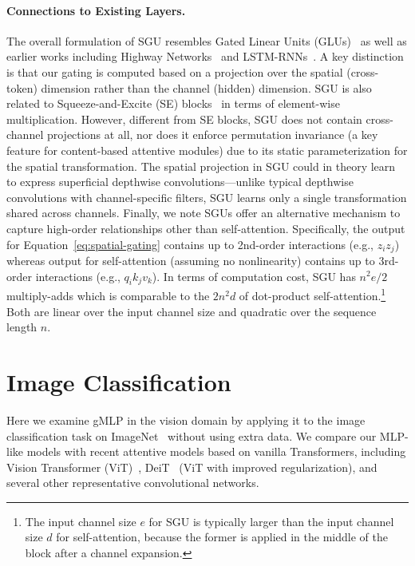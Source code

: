 \documentclass{article}
\newcommand{\gffn}{gMLP\xspace}
\begin{document}
\paragraph{Connections to Existing Layers.}
The overall formulation of SGU resembles Gated Linear Units (GLUs)~\cite{dauphin2017language, shazeer2020glu, wu2019pay} as well as earlier works including Highway Networks~\cite{srivastava2015highway} and LSTM-RNNs~\cite{lstm}. A key distinction is that our gating is computed based on a projection over the spatial (cross-token) dimension rather than the channel (hidden) dimension.
SGU is also related to Squeeze-and-Excite (SE) blocks~\cite{hu2018squeeze} in terms of element-wise multiplication. However, different from SE blocks, SGU does not contain cross-channel projections at all, nor does it enforce permutation invariance (a key feature for content-based attentive modules) due to its static parameterization for the spatial transformation.
The spatial projection in SGU could in theory learn to express superficial depthwise convolutions---unlike typical depthwise convolutions with channel-specific filters,
SGU learns only a single transformation shared across channels.
Finally,
we note SGUs offer an alternative mechanism to capture high-order relationships other than self-attention. Specifically, the output for Equation~\eqref{eq:spatial-gating} contains up to 2nd-order interactions (e.g., $z_iz_j$) whereas output for self-attention (assuming no nonlinearity) contains up to 3rd-order interactions (e.g., $q_ik_jv_k$).
In terms of computation cost,
SGU has $n^2 e / 2$ multiply-adds which is comparable to the $2n^2 d$ of dot-product self-attention.\footnote{The input channel size $e$ for SGU is typically larger than the input channel size $d$ for self-attention, because the former is applied in the middle of the block after a channel expansion.} Both are linear over the input channel size and quadratic over the sequence length $n$.

\FloatBarrier
\section{Image Classification}
\label{sec:vision}
Here we examine \gffn in the vision domain by applying it to the image classification task on ImageNet~\cite{deng2009imagenet} without using extra data.
We compare our MLP-like models with recent attentive models based on vanilla Transformers, including Vision Transformer (ViT)~\cite{dosovitskiy2020image}, DeiT~\cite{touvron2020training} (ViT with improved regularization),
and several other representative convolutional networks.
\end{document}
